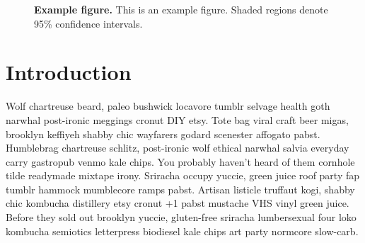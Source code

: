 \documentclass[aps,pre,twocolumn,nofootinbib,superscriptaddress,linenumbers,11point]{revtex4-1}
\begin{document}
\begin{figure}[tbp]
\caption{\label{figure:example} {\bf Example figure.} 
This is an example figure.
Shaded regions denote 95\% confidence intervals.
}
\end{figure}


\section*{Introduction}
\label{section:introduction}

Wolf chartreuse beard, paleo bushwick locavore tumblr selvage health goth narwhal post-ironic meggings cronut DIY etsy. 
Tote bag viral craft beer migas, brooklyn keffiyeh shabby chic wayfarers godard scenester affogato pabst. 
Humblebrag chartreuse schlitz, post-ironic wolf ethical narwhal salvia everyday carry gastropub venmo kale chips. You probably haven't heard of them cornhole tilde readymade mixtape irony. 
Sriracha occupy yuccie, green juice roof party fap tumblr hammock mumblecore ramps pabst. Artisan listicle truffaut kogi, shabby chic kombucha distillery etsy cronut +1 pabst mustache VHS vinyl green juice. 
Before they sold out brooklyn yuccie, gluten-free sriracha lumbersexual four loko kombucha semiotics letterpress biodiesel kale chips art party normcore slow-carb.
\end{document}
